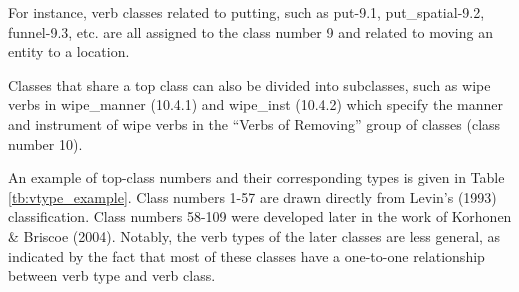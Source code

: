 For instance, verb classes related to putting, such as put-9.1, put\_spatial-9.2, funnel-9.3, etc. are all assigned to the class number 9 and related to moving an entity to a location. 

Classes that share a top class can also be divided into subclasses, such as wipe verbs in wipe\_manner (10.4.1) and wipe\_inst (10.4.2) which specify the manner and instrument of wipe verbs in the \enquote{Verbs of Removing} group of classes (class number 10). 

An example of top-class numbers and their corresponding types is given in Table \ref{tb:vtype_example}. Class numbers 1-57 are drawn directly from Levin's (1993) classification. Class numbers 58-109 were developed later in the work of Korhonen \& Briscoe (2004). Notably, the verb types of the later classes are less general, as indicated by the fact that most of these classes have a one-to-one relationship between verb type and verb class.

